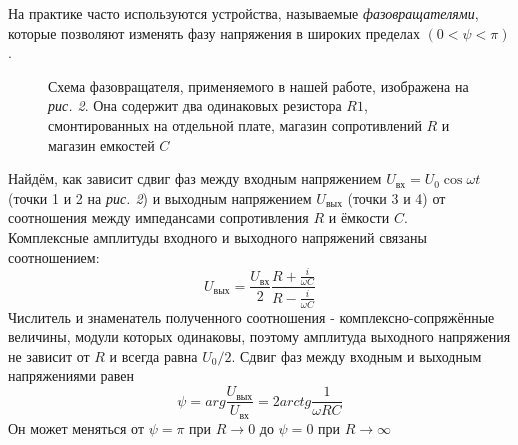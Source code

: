 \newpage
На практике часто используются устройства, называемые \textit{фазовращателями}, которые позволяют изменять фазу напряжения в широких пределах $(0 < \psi < \pi)$. \\

\begin{figure}[!h]
	\begin{minipage}[h]{0.35\linewidth}
	Схема фазовращателя, применяемого в нашей работе, изображена
	на \textit{рис. 2}. Она содержит
	два одинаковых резистора $ R1 $, смонтированных
	на отдельной плате, магазин сопротивлений $ R $ и
	магазин емкостей $ C	 $
	\end{minipage}
	\hfill
	\begin{minipage}[h]{0.55\linewidth}
	\end{minipage}
\end{figure}

Найдём, как зависит сдвиг фаз между входным напряжением $U_{вх} = U_0 \cos \omega t$ (точки 1 и 2 на \textit{рис. 2}) и выходным напряжением $U_{вых}$ (точки 3 и 4) от соотношения между импедансами сопротивления $R$ и ёмкости $C$. \\
Комплексные амплитуды входного и выходного напряжений связаны соотношением: \\
\[
U_{вых} = \frac{U_{вх}}{2}\frac{R + \frac{i}{\omega C}}{R - \frac{i}{\omega C}}
\]
Числитель и знаменатель полученного соотношения - комплексно-сопряжённые величины, модули которых одинаковы, поэтому амплитуда выходного напряжения не зависит от $ R $ и всегда равна $ U_0/2 $. Сдвиг фаз между входным и выходным напряжениями равен \\ 
\[
\psi = arg\frac{U_{вых}}{U_{вх}} = 2 arctg \frac{1}{\omega R C}
\]
Он может меняться от $\psi = \pi$ при $ R \rightarrow 0 $ до $ \psi = 0 $ при $ R \rightarrow \infty $

